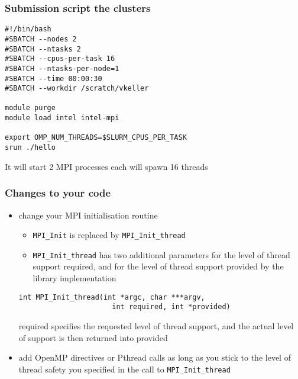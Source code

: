 \begin{frame}[containsverbatim]
\frametitle{Submission script the clusters}

\begin{verbatim}
#!/bin/bash
#SBATCH --nodes 2
#SBATCH --ntasks 2
#SBATCH --cpus-per-task 16
#SBATCH --ntasks-per-node=1
#SBATCH --time 00:00:30
#SBATCH --workdir /scratch/vkeller

module purge
module load intel intel-mpi

export OMP_NUM_THREADS=$SLURM_CPUS_PER_TASK
srun ./hello 
\end{verbatim}

It will start 2 MPI processes each will spawn 16 threads

\end{frame}













\begin{frame}[fragile]
\frametitle{Changes to your code}
\begin{itemize}
\item change your MPI initialisation routine
\begin{itemize}
    \item \verb+MPI_Init+ is replaced by \verb+MPI_Init_thread+
    \item \verb+MPI_Init_thread+ has two additional parameters for the level of thread support
        required, and for the level of thread support provided by the library implementation
\end{itemize}

\begin{Verbatim}[formatcom=\color{blue}]
int MPI_Init_thread(int *argc, char ***argv, 
                      int required, int *provided)
\end{Verbatim}

       \textcolor{dkgreen}{required specifies       the     requested       level   of      thread  support,        and     the     actual  level   of      support is      then    returned        into    provided}

\item add OpenMP directives or Pthread calls as long as you stick to the level of thread safety you specified in the call to \verb+MPI_Init_thread+
\end{itemize}

\end{frame}


